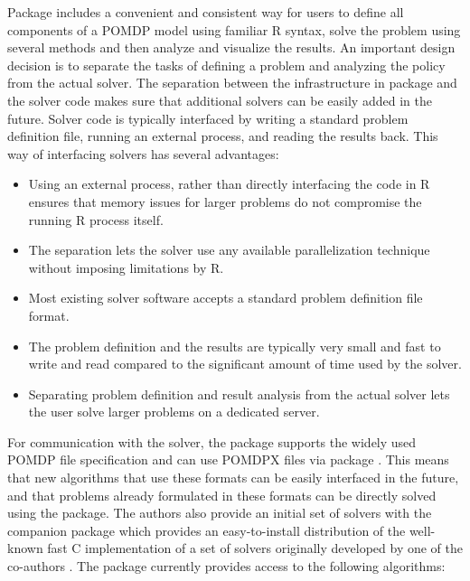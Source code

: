 Package  includes a convenient and consistent way for users to define all components of a POMDP
model using familiar R syntax, solve the problem using several methods and then analyze and visualize the results.
An important design decision is to separate the tasks of defining a problem and analyzing the policy from
the actual solver.
The separation between the infrastructure in
package  and the
solver code makes sure that additional solvers can be easily added in the future.
Solver code is typically interfaced by writing a standard problem definition file, running an external process,
and reading the results back. This way of interfacing solvers has several advantages:

\begin{itemize}
\tightlist
\item
  Using an external process, rather than directly interfacing the code in R ensures that memory issues for larger problems do not compromise the running R process itself.
\item
  The separation lets the solver use any available parallelization technique without imposing limitations
  by R.
\item
  Most existing solver software accepts a standard problem definition file format.
\item
  The problem definition and the results are typically very small and fast to write and read compared to the significant amount of time used by the solver.
\item
  Separating problem definition and result analysis from the actual solver lets the user solve larger problems
  on a dedicated server.
\end{itemize}

For communication with the solver, the package supports the widely used POMDP \citep{Cassandra2015} file specification and can use POMDPX files \citep{APPL2022} via package . This means that
new algorithms that use these formats can be easily interfaced in the future, and that
problems already formulated in these formats can be directly solved using the package.
The authors also provide an initial set of solvers with the companion package  which
provides an easy-to-install distribution of the well-known fast C implementation of a set of solvers originally developed by one of the co-authors \citep{Cassandra2015}.
The package  currently provides access to the following algorithms:

